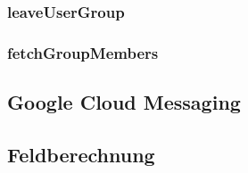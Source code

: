 \subsubsection*{leaveUserGroup}


\subsubsection*{fetchGroupMembers}



\subsection{Google Cloud Messaging}

\subsection{Feldberechnung}
\label{subsec:Feldberechnung}
